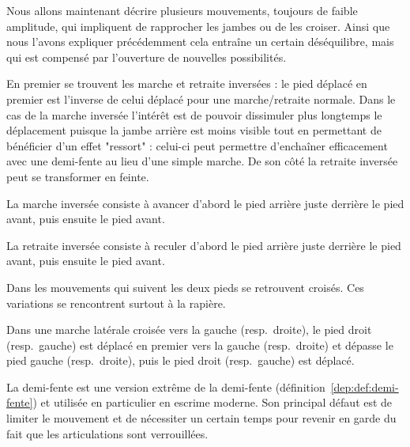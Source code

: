 Nous allons maintenant décrire plusieurs mouvements, toujours de faible amplitude, qui impliquent de rapprocher les jambes ou de les croiser.
Ainsi que nous l'avons expliquer précédemment cela entraîne un certain déséquilibre, mais qui est compensé par l'ouverture de nouvelles possibilités.

En premier se trouvent les marche et retraite inversées : le pied déplacé en premier est l'inverse de celui déplacé pour une marche/retraite normale.
Dans le cas de la marche inversée l'intérêt est de pouvoir dissimuler plus longtemps le déplacement puisque la jambe arrière est moins visible tout en permettant de bénéficier d'un effet "ressort" : celui-ci peut permettre d'enchaîner efficacement avec une demi-fente au lieu d'une simple marche.
De son côté la retraite inversée peut se transformer en feinte.


\begin{definition}

	La marche inversée consiste à avancer d'abord le pied arrière juste derrière le pied avant, puis ensuite le pied avant.
\end{definition}


\begin{definition}

	La retraite inversée consiste à reculer d'abord le pied arrière juste derrière le pied avant, puis ensuite le pied avant.
\end{definition}


Dans les mouvements qui suivent les deux pieds se retrouvent croisés.
Ces variations se rencontrent surtout à la rapière.

\begin{definition}

	Dans une marche latérale croisée vers la gauche (resp.\ droite), le pied droit (resp.\ gauche) est déplacé en premier vers la gauche (resp.\ droite) et dépasse le pied gauche (resp.\ droite), puis le pied droit (resp.\ gauche) est déplacé.
\end{definition}


La demi-fente est une version extrême de la demi-fente (définition~\ref{dep:def:demi-fente}) et utilisée en particulier en escrime moderne.
Son principal défaut est de limiter le mouvement et de nécessiter un certain temps pour revenir en garde du fait que les articulations sont verrouillées.


